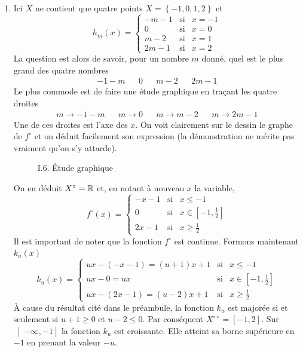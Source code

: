 \begin{enumerate}
\item  Ici $X$ ne contient que quatre points $X=\left\{ -1,0,1,2\right\}$ et
\[
h_{m}(x)=\left\{
\begin{array}{ccc}
-m-1 & \text{si} & x=-1 \\
0 & \text{si} & x=0 \\
m-2 & \text{si} & x=1 \\
2m-1 & \text{si} & x=2
\end{array}
\right.
\]
La question est alors de savoir, pour un nombre $m$ donn\'{e}, quel est le plus grand des quatre nombres
\begin{align*}
 -1-m & & 0 & & m-2 & & 2m-1
\end{align*}
Le plus commode est de faire une étude graphique en traçant les quatre droites 
\begin{align*}
 m\rightarrow -1-m & & m\rightarrow 0 & & m\rightarrow m-2 & & m\rightarrow 2m-1
\end{align*}
Une de ces droites est l'axe des $x$. On voit clairement sur le dessin le graphe de $f^\circ$ et on déduit facilement son expression (la démonstration ne mérite pas vraiment qu'on s'y attarde).
\begin{figure}
   \centering
   
   \caption{I.6. \'Etude graphique}
   \label{fig:Cdualsup_1}
\end{figure}
On en d\'{e}duit $X^{\circ }=\mathbb{R}$ et, en notant \`{a} nouveau $x$ la variable,
\[
f^{\circ }(x)=\left\{
\begin{array}{ccc}
-x-1 & \text{si} & x\leq -1 \\
0 & \text{si} & x\in \left[ -1,\frac{1}{2}\right]  \\
2x-1 & \text{si} & x\geq \frac{1}{2}
\end{array}
\right.
\]
Il est important de noter que la fonction $f^{\circ }$ est continue. Formons maintenant $k_{u}(x)$
\[
k_{u}(x)=\left\{
\begin{array}{ccc}
ux-(-x-1)=(u+1)x+1 & \text{si} & x\leq -1 \\
ux-0=ux & \text{si} & x\in \left[ -1,\frac{1}{2}\right]  \\
ux-(2x-1)=(u-2)x+1 & \text{si} & x\geq \frac{1}{2}
\end{array}
\right.
\]
\`A cause du r\'{e}sultat cit\'{e} dans le pr\'{e}ambule, la fonction $k_{u}$ est major\'{e}e si et seulement si $u+1\geq 0$ et $u-2\leq 0$. Par cons\'{e}quent $X^{\circ \circ }=\left[ -1,2\right] $.\newline
Sur $\left] -\infty ,-1\right] $ la fonction $k_{u}$ est croissante. Elle atteint sa borne sup\'{e}rieure en $-1$ en prenant la valeur $-u$.\newline

\end{enumerate}
